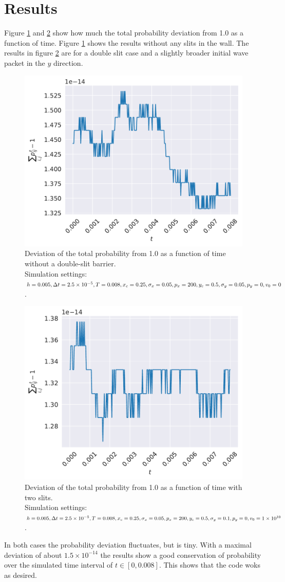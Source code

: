 \documentclass[english,notitlepage,reprint,nofootinbib]{revtex4-1}  %
\begin{document}
\section{Results}\label{sec:results}
%
Figure \ref{fig:no_slit_p_diff} and \ref{fig:double_slit_p_diff} show how much the total probability deviation from 1.0 as a function of time. Figure \ref{fig:no_slit_p_diff} shows the results without any slits in the wall. The results in  figure \ref{fig:double_slit_p_diff} are for a double slit case and a slightly broader initial wave packet in the $y$ direction.
\begin{figure}[H]
    \centering
    \includegraphics[width=.5\textwidth]{../figures/no_slit_p_diff.pdf}
    \caption{Deviation of the total probability from 1.0 as a function of time without a double-slit barrier. \\Simulation settings: $h = 0.005, \Delta t = 2.5 \times 10^{-5}, \\T = 0.008, x_c = 0.25, \sigma_x = 0.05, p_x = 200, y_c = 0.5, \\\sigma_y = 0.05, p_y = 0, v_0 = 0$.}
    \label{fig:no_slit_p_diff}
\end{figure}

\begin{figure}[H]
    \centering
    \includegraphics[width=.5\textwidth]{../figures/double_slit_p_diff.pdf}
    \caption{Deviation of the total probability from 1.0 as a function of time with two slits. \\Simulation settings: $h = 0.005, \Delta t = 2.5 \times 10^{-5}, \\T = 0.008, x_c = 0.25, \sigma_x = 0.05, p_x = 200, y_c = 0.5, \\\sigma_y = 0.1, p_y = 0, v_0 = 1 \times 10^{10}$.}
    \label{fig:double_slit_p_diff}
\end{figure}
In both cases the probability deviation fluctuates, but is tiny. With a maximal deviation of about $1.5 \times 10^{-14}$ the results show a good conservation of probability over the simulated time interval of $t \in [0,0.008]$. This shows that the code woks as desired.
\end{document}
